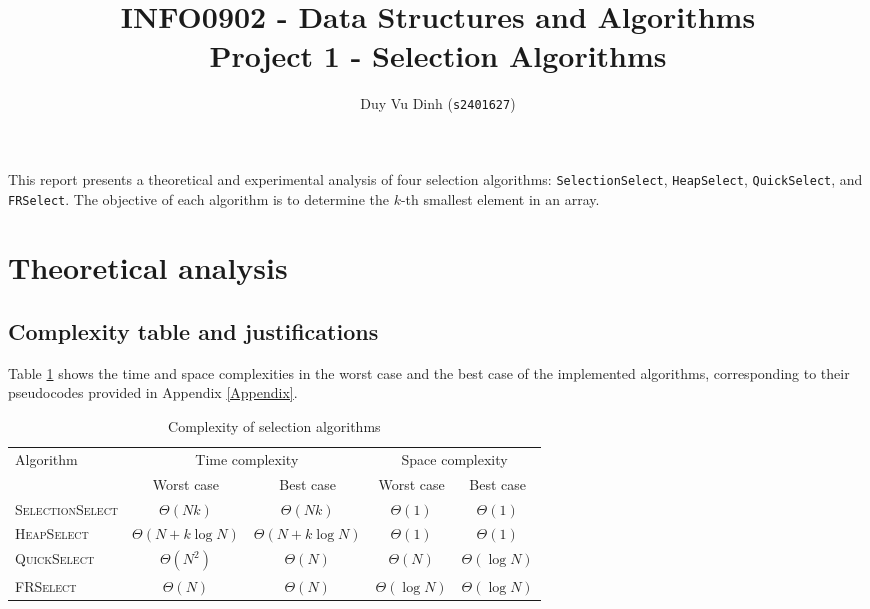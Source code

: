 \documentclass[acmconf,nonacm=true]{acmart}
\begin{document}
\title{INFO0902 - Data Structures and Algorithms \\ 
Project 1 - Selection Algorithms}

\author{Duy Vu Dinh (\texttt{s2401627})}

\maketitle





This report presents a theoretical and experimental analysis of four selection algorithms: \texttt{SelectionSelect}, \texttt{HeapSelect}, \texttt{QuickSelect}, and \texttt{FRSelect}. The objective of each algorithm is to determine the $k$-th smallest element in an array.


\section{Theoretical analysis}

\subsection{Complexity table and justifications} \label{sec:theory-complexity-results}

Table \ref{tab:complexity} shows the time and space complexities in the worst case and the best case of the implemented algorithms, corresponding to their pseudocodes provided in Appendix \ref{Appendix}.

    \begin{table}[h]
        \centering
        \footnotesize
        \caption{Complexity of selection algorithms}
        \label{tab:complexity}
        \begin{tabular}{lcccc}
            \hline
            Algorithm & \multicolumn{2}{c}{Time complexity} & \multicolumn{2}{c}{Space complexity} \\
            \cmidrule(r){2-3} \cmidrule(l){4-5}
            & Worst case & Best case & Worst case & Best case \\
            \hline
            \textsc{SelectionSelect} & $\Theta(Nk)$ & $\Theta(Nk)$ & $\Theta(1)$ & $\Theta(1)$ \\
            \textsc{HeapSelect} & $\Theta(N + k \log N)$ & $\Theta(N + k \log N)$ & $\Theta(1)$ & $\Theta(1)$ \\
            \textsc{QuickSelect} & $\Theta(N^2)$ & $\Theta(N)$ & $\Theta(N)$ & $\Theta(\log N)$ \\
            \textsc{FRSelect} & $\Theta(N)$ & $\Theta(N)$ & $\Theta(\log N)$ & $\Theta(\log N)$ \\
            \hline
        \end{tabular}
    \end{table}
\end{document}
